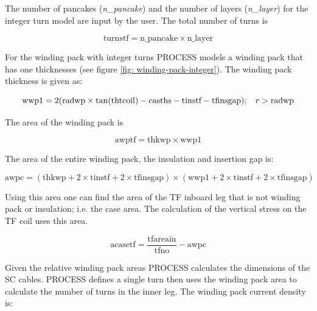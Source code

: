 \documentclass[hidelinks]{article}
\numberwithin{equation}{section}
\begin{document}
    The number of pancakes (\emph{n\_pancake}) and the number of layers (\emph{n\_layer}) 
    for the integer turn model are input by the user. The total number of turns is
    
    \begin{equation}\label{eq: turnstf-int}
        \text{turnstf} = \text{n\_pancake} \times \text{n\_layer}
    \end{equation}

    \noi For the winding pack with integer turns PROCESS models a winding pack 
    that has one thicknesses (see figure \ref{fig: winding-pack-integer}). The winding 
    pack thickness is given as:

    \begin{equation}\label{eq: wwp1-int}
    \text{wwp1} = 2(\text{radwp}\times \tan(\text{thtcoil}) - \text{casths} - \text{tinstf} 
    - \text{tfinsgap}); \hspace{0.3cm} r > \text{radwp}
    \end{equation}

    \noi The area of the winding pack is

    \begin{equation}\label{eq: awptf-int}
    \text{awptf} = \text{thkwp} \times \text{wwp1}
    \end{equation}

    \noi The area of the entire winding pack, the insulation and insertion gap is:

    \begin{equation}\label{eq: awpc-int}
    \text{awpc} = (\text{thkwp} + 2\times \text{tinstf} + 2\times \text{tfinsgap}) 
    \times (\text{wwp1} + 2\times \text{tinstf} + 2\times \text{tfinsgap})
    \end{equation}

    \noi Using this area one can find the area of the TF inboard leg that 
    is not winding pack or insulation; i.e. the case area. The calculation of the 
    vertical stress on the TF coil uses this area.

    \begin{equation}\label{eq: acasetf-int}
    \text{acasetf} = \frac{\text{tfareain}}{\text{tfno}} - \text{awpc}
    \end{equation}

    \noi Given the relative winding pack areas PROCESS calculates the dimensions of 
    the SC cables. PROCESS defines a single turn then uses the winding pack area to 
    calculate the number of turns in the inner leg. The winding pack current density is:
\end{document}
